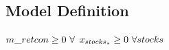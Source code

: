 \documentclass[11pt]{article}
\begin{document}
\subsection*{Model Definition}

\bigskip
$m\_retcon\geq 0 ~ \forall \\$
$x_{stocks_{*}}\geq 0 ~ \forall stocks\\$
\end{document}
